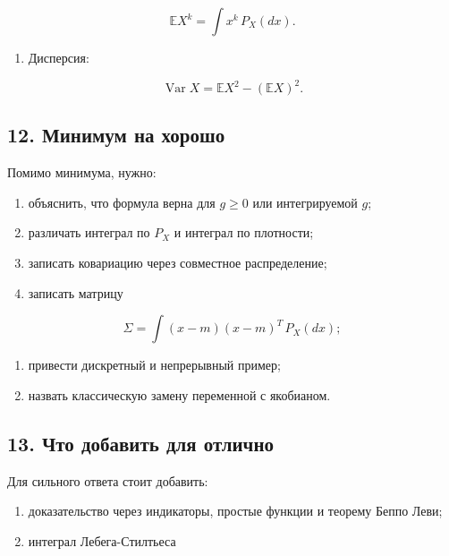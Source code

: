\documentclass[
  11pt,
  a4paper,
]{article}
\providecommand{\tightlist}{%
  \setlength{\itemsep}{0pt}\setlength{\parskip}{0pt}}
\begin{document}
\[
\mathbb EX^k=\int x^k\,P_X(dx).
\]

\begin{enumerate}
\def\labelenumi{\arabic{enumi}.}
\setcounter{enumi}{4}
\tightlist
\item
  Дисперсия:
\end{enumerate}

\[
\operatorname{Var}X=\mathbb EX^2-(\mathbb EX)^2.
\]

\subsection{12. Минимум на
хорошо}\label{ux43cux438ux43dux438ux43cux443ux43c-ux43dux430-ux445ux43eux440ux43eux448ux43e}

Помимо минимума, нужно:

\begin{enumerate}
\def\labelenumi{\arabic{enumi}.}
\tightlist
\item
  объяснить, что формула верна для \(g\ge0\) или интегрируемой \(g\);
\item
  различать интеграл по \(P_X\) и интеграл по плотности;
\item
  записать ковариацию через совместное распределение;
\item
  записать матрицу
\end{enumerate}

\[
\Sigma=\int (x-m)(x-m)^T\,P_X(dx);
\]

\begin{enumerate}
\def\labelenumi{\arabic{enumi}.}
\setcounter{enumi}{4}
\tightlist
\item
  привести дискретный и непрерывный пример;
\item
  назвать классическую замену переменной с якобианом.
\end{enumerate}

\subsection{13. Что добавить для
отлично}\label{ux447ux442ux43e-ux434ux43eux431ux430ux432ux438ux442ux44c-ux434ux43bux44f-ux43eux442ux43bux438ux447ux43dux43e}

Для сильного ответа стоит добавить:

\begin{enumerate}
\def\labelenumi{\arabic{enumi}.}
\tightlist
\item
  доказательство через индикаторы, простые функции и теорему Беппо Леви;
\item
  интеграл Лебега-Стилтьеса
\end{enumerate}
\end{document}

